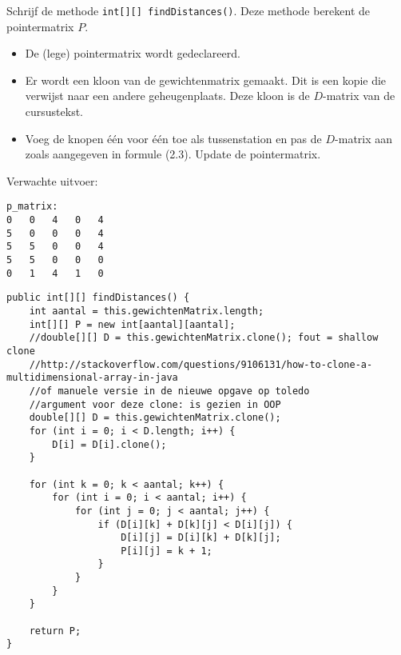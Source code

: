 \begin{oef}
\code Schrijf de methode \verb/int[][] findDistances()/. Deze methode berekent de pointermatrix $P$.
\begin{itemize}
\item De (lege) pointermatrix wordt gedeclareerd.
\item Er wordt een kloon van de gewichtenmatrix gemaakt. Dit is een kopie die verwijst naar een andere geheugenplaats. Deze kloon is de $D$-matrix van de cursustekst.
\item Voeg de knopen één voor één toe als tussenstation en pas de $D$-matrix aan zoals aangegeven in formule (2.3). Update de pointermatrix.
\end{itemize}

Verwachte uitvoer:
\begin{verbatim}
p_matrix: 
0	0	4	0	4	
5	0	0	0	4	
5	5	0	0	4	
5	5	0	0	0	
0	1	4	1	0
\end{verbatim}
\begin{opl}
\begin{lstlisting}[caption={findDistances}, label=FloydfindDistances]
public int[][] findDistances() {
	int aantal = this.gewichtenMatrix.length;
	int[][] P = new int[aantal][aantal];
	//double[][] D = this.gewichtenMatrix.clone(); fout = shallow clone
	//http://stackoverflow.com/questions/9106131/how-to-clone-a-multidimensional-array-in-java
	//of manuele versie in de nieuwe opgave op toledo
	//argument voor deze clone: is gezien in OOP
	double[][] D = this.gewichtenMatrix.clone();
	for (int i = 0; i < D.length; i++) {
	    D[i] = D[i].clone();
	}

	for (int k = 0; k < aantal; k++) {
		for (int i = 0; i < aantal; i++) {
			for (int j = 0; j < aantal; j++) {
				if (D[i][k] + D[k][j] < D[i][j]) {
					D[i][j] = D[i][k] + D[k][j];
					P[i][j] = k + 1;
				}
			}
		}
	}

	return P;
}
\end{lstlisting}
\end{opl}
\end{oef}




